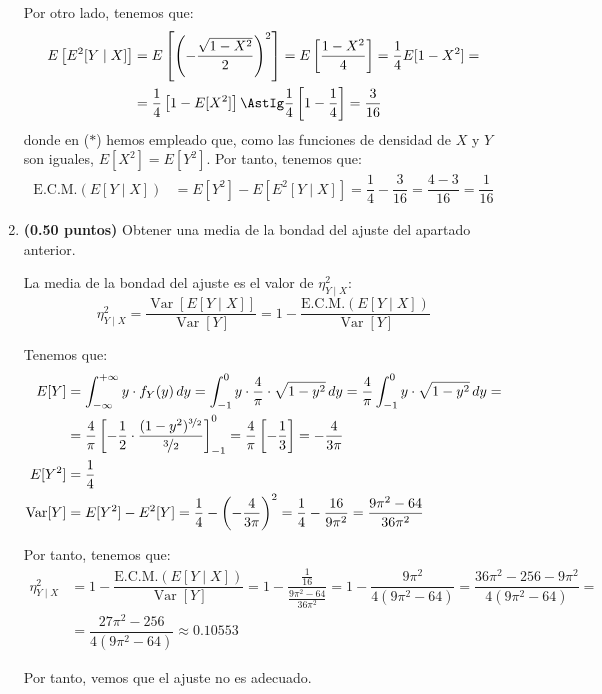 \documentclass[12pt]{article}
\DeclareMathOperator{\Var}{Var}
\begin{document}
\begin{ejercicio}[5 puntos]
\begin{enumerate}
    Por otro lado, tenemos que:
    \begin{align*}
        E\left[E^2[Y\mid X]\right] &= E\left[\left(-\dfrac{\sqrt{1-X^2}}{2}\right)^2\right]
        = E\left[\dfrac{1-X^2}{4}\right]
        = \dfrac{1}{4}E[1-X^2]
        =\\&= \dfrac{1}{4}\left[1-E[X^2]\right]
        \AstIg \dfrac{1}{4}\left[1-\dfrac{1}{4}\right] = \dfrac{3}{16}
    \end{align*}
    donde en ($\ast$) hemos empleado que, como las funciones de densidad de $X$ y $Y$ son iguales, $E[X^2]=E[Y^2]$. Por tanto, tenemos que:
    \begin{align*}
        \text{E.C.M.}(E[Y\mid X]) &= E[Y^2] - E\left[E^2[Y\mid X]\right]
        = \dfrac{1}{4} - \dfrac{3}{16}
        = \dfrac{4-3}{16} = \dfrac{1}{16}
    \end{align*}
    \item \textbf{(0.50 puntos)} Obtener una media de la bondad del ajuste del apartado anterior.
    
    La media de la bondad del ajuste es el valor de $\eta^2_{Y\mid X}$:
    \begin{equation*}
        \eta^2_{Y\mid X} = \dfrac{\Var[E[Y\mid X]]}{\Var[Y]} = 1-\dfrac{\text{E.C.M.}(E[Y\mid X])}{\Var[Y]}
    \end{equation*}

    Tenemos que:
    \begin{align*}
        E[Y] &= \int_{-\infty}^{+\infty} y\cdot f_Y(y) \, dy
        = \int_{-1}^0 y\cdot \dfrac{4}{\pi} \cdot \sqrt{1-y^2} \, dy
        = \dfrac{4}{\pi} \int_{-1}^0 y\cdot \sqrt{1-y^2} \, dy
        =\\&= \dfrac{4}{\pi}\left[-\dfrac{1}{2}\cdot \dfrac{(1-y^2)^{\nicefrac{3}{2}}}{\nicefrac{3}{2}}\right]_{-1}^0
        = \dfrac{4}{\pi}\left[-\dfrac{1}{3}\right]
        = -\dfrac{4}{3\pi}\\
        E[Y^2] &= \dfrac{1}{4}\\
        \Var[Y] &= E[Y^2] - E^2[Y] = \dfrac{1}{4} - \left(-\dfrac{4}{3\pi}\right)^2 = \dfrac{1}{4} - \dfrac{16}{9\pi^2}
        = \dfrac{9\pi^2-64}{36\pi^2}
    \end{align*}

    Por tanto, tenemos que:
    \begin{align*}
        \eta^2_{Y\mid X} &= 1-\dfrac{\text{E.C.M.}(E[Y\mid X])}{\Var[Y]}
        = 1-\dfrac{\frac{1}{16}}{\frac{9\pi^2-64}{36\pi^2}}
        = 1-\dfrac{9\pi^2}{4(9\pi^2-64)}
        = \dfrac{36\pi^2-256-9\pi^2}{4(9\pi^2-64)}
        =\\&= \dfrac{27\pi^2-256}{4(9\pi^2-64)}\approx 0.10553
    \end{align*}

    Por tanto, vemos que el ajuste no es adecuado.
\end{enumerate}
    \end{ejercicio}
\end{document}
